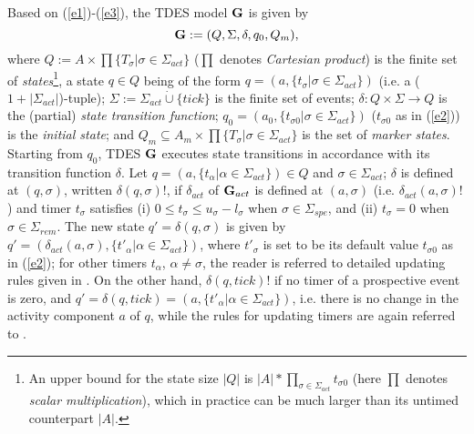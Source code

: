 \documentclass[twocolumn]{autart}
\begin{document}
Based on (\ref{e1})-(\ref{e3}), the TDES model ${\bf G}$ is given by
\begin{equation} \label{e4}
{\bf G} := (Q, \Sigma, \delta, q_0, Q_m),
\end{equation}
where $Q := A \times \prod\{T_\sigma|\sigma \in \Sigma_{act}\}$
($\prod$ denotes \emph{Cartesian product}) is the finite set of
\emph{states}\footnote{An upper bound for the state size $|Q|$ is
$|A| * \prod\limits_{\sigma \in \Sigma_{act}} t_{\sigma0}$ (here
$\prod$ denotes \emph{scalar multiplication}), which in practice can
be much larger than its untimed counterpart $|A|$.}, a state $q \in
Q$ being of the form $q = (a, \{t_\sigma|\sigma \in \Sigma_{act}\})$
(i.e. a ($1+|\Sigma_{act}|$)-tuple); $\Sigma := \Sigma_{act}
\dot\cup \{tick\}$ is the finite set of events;
$\delta:Q\times\Sigma \rightarrow Q$ is the (partial) {\it state
transition function}; $q_0 = (a_0, \{t_{\sigma 0}|\sigma \in
\Sigma_{act}\})$ ($t_{\sigma 0}$ as in (\ref{e2})) is the {\it
initial state}; and $Q_m \subseteq A_m \times \prod\{T_\sigma|\sigma
\in \Sigma_{act}\}$ is the set of {\it marker states}.  Starting
from $q_0$, TDES ${\bf G}$ executes state transitions in accordance
with its transition function $\delta$.  Let $q=(a,\{t_\alpha|\alpha
\in \Sigma_{act}\}) \in Q$ and $\sigma \in \Sigma_{act}$; $\delta$
is defined at $(q,\sigma)$, written $\delta(q,\sigma)!$, if
$\delta_{act}$ of ${\bf G}_{act}$ is defined at $(a,\sigma)$ (i.e.
$\delta_{act}(a,\sigma)!$) and timer $t_\sigma$ satisfies (i) $0
\leq t_\sigma \leq u_\sigma-l_\sigma$ when $\sigma \in
\Sigma_{spe}$, and (ii) $t_\sigma=0$ when $\sigma \in \Sigma_{rem}$.
The new state $q'=\delta(q,\sigma)$ is given by
$q'=(\delta_{act}(a,\sigma), \{t'_\alpha|\alpha \in
\Sigma_{act}\})$, where $t'_\sigma$ is set to be its default value
$t_{\sigma 0}$ as in (\ref{e2}); for other timers $t_{\alpha}$,
$\alpha \neq \sigma$, the reader is referred to detailed updating
rules given in \cite{BrandinWonham:94,Wonham:2011a}. On the other
hand, $\delta(q, tick)!$ if no timer of a prospective event is zero,
and $q'=\delta(q, tick)=(a,\{t'_\alpha|\alpha \in \Sigma_{act}\})$,
i.e. there is no change in the activity component $a$ of $q$, while
the rules for updating timers are again referred to
\cite{BrandinWonham:94,Wonham:2011a}.
\end{document}
